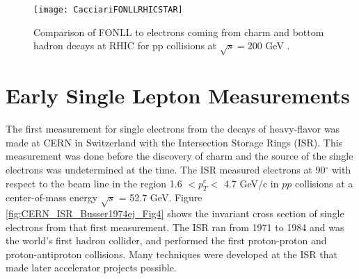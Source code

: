 
\begin{figure}[h]
  \centering
  \texttt{[image: CacciariFONLLRHICSTAR]}\\
  \caption{Comparison of FONLL to electrons coming from charm and bottom hadron decays at RHIC for pp collisions at $\sqrt{s} = 200$ GeV \cite{Cacciari:2005rk}.} \label{fig:CacciariFONLLRHICSTAR}
\end{figure}






\section{Early Single Lepton Measurements}

The first measurement for single electrons from the decays of heavy-flavor was made at CERN in Switzerland with the Intersection Storage Rings (ISR). This measurement was done before the discovery of charm and the source of the single electrons was undetermined at the time. The ISR measured electrons \cite{Busser:1974ej} at 90$^{\circ}$ with respect to the beam line in the region 1.6 $< p_{T}^{e} <$ 4.7 GeV/c in $pp$ collisions at a center-of-mass energy $\sqrt{s}$ = 52.7 GeV. Figure \ref{fig:CERN_ISR_Busser1974ej_Fig4} \cite{Busser:1974ej} shows the invariant cross section of single electrons from that first measurement. The ISR ran from 1971 to 1984 and was the world's first hadron collider, and performed the first proton-proton and proton-antiproton collisions. Many techniques were developed at the ISR that made later accelerator projects possible. 

